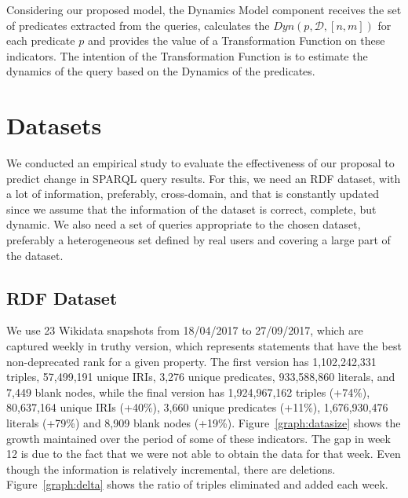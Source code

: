 \documentclass[runningheads]{llncs}
\begin{document}
Considering our proposed model, the Dynamics Model component receives the set of predicates extracted from the queries, calculates the $Dyn(p, \mathcal{D},[n,m])$ for each predicate $p$ and provides the value of a Transformation Function on these indicators. The intention of the Transformation Function is to estimate the dynamics of the query based on the Dynamics of the predicates.


\section{Datasets}
\label{sec:data}

We conducted an empirical study to evaluate the effectiveness of our proposal to predict change in SPARQL query results. For this, we need an RDF dataset, with a lot of information, preferably, cross-domain, and that is constantly updated since we assume that the information of the dataset is correct, complete, but dynamic. We also need a set of queries appropriate to the chosen dataset, preferably a heterogeneous set defined by real users and covering a large part of the dataset.

\subsection{RDF Dataset}

We use 23 Wikidata snapshots from 18/04/2017 to 27/09/2017, which are captured weekly in truthy version, which represents statements that have the best non-deprecated rank for a given property. 
The first version has 1,102,242,331 triples, 57,499,191 unique IRIs, 3,276 unique predicates, 933,588,860 literals, and 7,449 blank nodes, while the final version has 1,924,967,162 triples (+74\%), 80,637,164 unique IRIs (+40\%), 3,660 unique predicates (+11\%), 1,676,930,476 literals (+79\%) and 8,909 blank nodes (+19\%). Figure~\ref{graph:datasize} shows the growth maintained over the period of some of these indicators. The gap in week 12 is due to the fact that we were not able to obtain the data for that week. Even though the information is relatively incremental, there are deletions. Figure~\ref{graph:delta} shows the ratio of triples eliminated and added each week.
\end{document}
